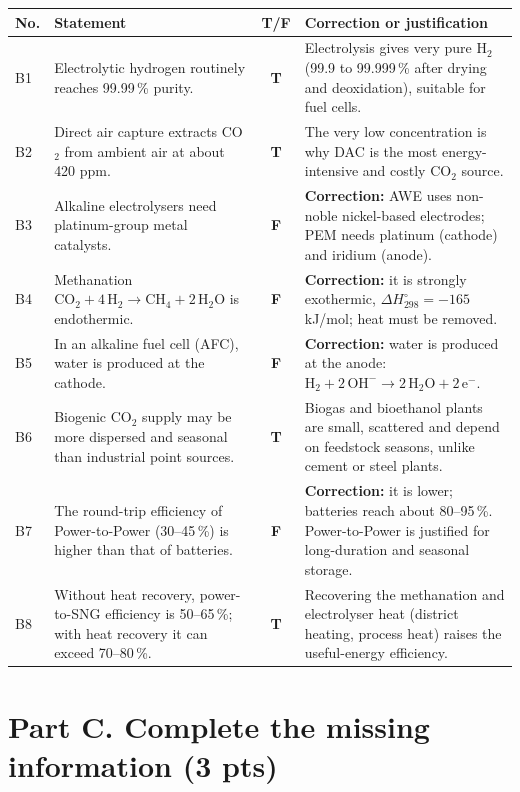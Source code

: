 \documentclass[11pt,a4paper]{article}
\newcommand{\fillin}[1]{\textcolor{ans}{\textbf{#1}}}
\newcommand{\pts}[1]{\hfill{\normalsize\textbf{(#1)}}}
\begin{document}
{\small
\renewcommand{\arraystretch}{1.35}
\begin{tabularx}{\linewidth}{@{}p{0.6cm}>{\raggedright\arraybackslash}p{5.6cm}c>{\raggedright\arraybackslash}X@{}}
\toprule
\textbf{No.} & \textbf{Statement} & \textbf{T/F} & \textbf{Correction or justification}\\
\midrule
B1 & Electrolytic hydrogen routinely reaches 99.99\,\% purity. & \fillin{T} &
  Electrolysis gives very pure H$_2$ (99.9 to 99.999\,\% after drying and deoxidation), suitable for fuel cells. \\
B2 & Direct air capture extracts CO$_2$ from ambient air at about 420 ppm. & \fillin{T} &
  The very low concentration is why DAC is the most energy-intensive and costly CO$_2$ source. \\
B3 & Alkaline electrolysers need platinum-group metal catalysts. & \fillin{F} &
  \textbf{Correction:} AWE uses non-noble nickel-based electrodes; PEM needs platinum (cathode) and iridium (anode). \\
B4 & Methanation $\mathrm{CO_2 + 4\,H_2 \rightarrow CH_4 + 2\,H_2O}$ is endothermic. & \fillin{F} &
  \textbf{Correction:} it is strongly exothermic, $\Delta H^\circ_{298} = -165$ kJ/mol; heat must be removed. \\
B5 & In an alkaline fuel cell (AFC), water is produced at the cathode. & \fillin{F} &
  \textbf{Correction:} water is produced at the anode: $\mathrm{H_2 + 2\,OH^- \rightarrow 2\,H_2O + 2\,e^-}$. \\
B6 & Biogenic CO$_2$ supply may be more dispersed and seasonal than industrial point sources. & \fillin{T} &
  Biogas and bioethanol plants are small, scattered and depend on feedstock seasons, unlike cement or steel plants. \\
B7 & The round-trip efficiency of Power-to-Power (30--45\,\%) is higher than that of batteries. & \fillin{F} &
  \textbf{Correction:} it is lower; batteries reach about 80--95\,\%. Power-to-Power is justified for long-duration and seasonal storage. \\
B8 & Without heat recovery, power-to-SNG efficiency is 50--65\,\%; with heat recovery it can exceed 70--80\,\%. & \fillin{T} &
  Recovering the methanation and electrolyser heat (district heating, process heat) raises the useful-energy efficiency. \\
\bottomrule
\end{tabularx}}

\section{Part C. Complete the missing information \pts{3 pts}}
\end{document}
